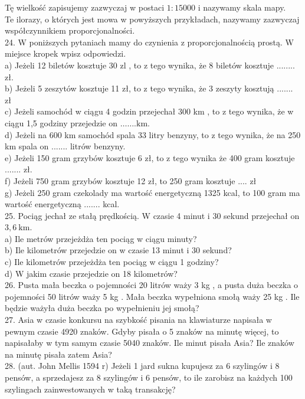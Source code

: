 \documentclass[10pt]{article}
\begin{document}
Tę wielkość zapisujemy zazwyczaj w postaci \(1: 15000\) i nazywamy skala mapy.\\
Te ilorazy, o których jest mowa w powyższych przykładach, nazywamy zazwyczaj współczynnikiem proporcjonalności.\\
24. W poniższych pytaniach mamy do czynienia z proporcjonalnością prostą. W miejsce kropek wpisz odpowiedzi.\\
a) Jeżeli 12 biletów kosztuje 30 zl , to z tego wynika, że 8 biletów kosztuje ........ zł.\\
b) Jeżeli 5 zeszytów kosztuje 11 zł, to z tego wynika, że 3 zeszyty kosztują ....... zł\\
c) Jeżeli samochód w ciągu 4 godzin przejechał 300 km , to z tego wynika, że w ciągu 1,5 godziny przejedzie on \(\ldots \ldots . \mathrm{km}\).\\
d) Jeżeli na 600 km samochód spala 33 litry benzyny, to z tego wynika, że na 250 km spala on ....... litrów benzyny.\\
e) Jeżeli 150 gram grzybów kosztuje 6 zł, to z tego wynika że 400 gram kosztuje ....... zł.\\
f) Jeżeli 750 gram grzybów kosztuje 12 zł, to 250 gram kosztuje .... zł\\
g) Jeżeli 250 gram czekolady ma wartość energetyczną 1325 kcal, to 100 gram ma wartość energetyczną ....... kcal.\\
25. Pociąg jechał ze stałą prędkością. W czasie 4 minut i 30 sekund przejechał on \(3,6 \mathrm{~km}\).\\
a) Ile metrów przejeżdża ten pociąg w ciągu minuty?\\
b) Ile kilometrów przejedzie on w czasie 13 minut i 30 sekund?\\
c) Ile kilometrów przejeżdża ten pociąg w ciągu 1 godziny?\\
d) W jakim czasie przejedzie on 18 kilometrów?\\
26. Pusta mała beczka o pojemności 20 litrów waży 3 kg , a pusta duża beczka o pojemności 50 litrów waży 5 kg . Mała beczka wypełniona smołą waży 25 kg . Ile będzie ważyła duża beczka po wypełnieniu jej smołą?\\
27. Asia w czasie konkursu na szybkość pisania na klawiaturze napisała w pewnym czasie 4920 znaków. Gdyby pisała o 5 znaków na minutę więcej, to napisałaby w tym samym czasie 5040 znaków. Ile minut pisała Asia? Ile znaków na minutę pisała zatem Asia?\\
28. (aut. John Mellis 1594 r) Jeżeli 1 jard sukna kupujesz za 6 szylingów i 8 pensów, a sprzedajesz za 8 szylingów i 6 pensów, to ile zarobisz na każdych 100 szylingach zainwestowanych w taką transakcję?
\end{document}
